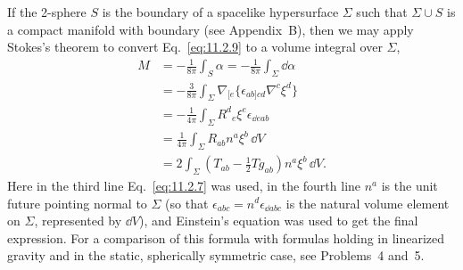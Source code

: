 If the 2-sphere \(S\) is the boundary of a spacelike hypersurface \(\Sigma\) such that
\(\Sigma\cup S\) is a compact manifold with boundary (see Appendix~B), then we may
apply Stokes's theorem to convert Eq.~\eqref{eq:11.2.9} to a volume integral over
\(\Sigma\),
\begin{equation}
  \begin{aligned}
  M&=-\frac{1}{8\pi}\int_S\alpha
    =-\frac{1}{8\pi}\int_\Sigma \dd\alpha\\
   &=-\frac{3}{8\pi}\int_\Sigma
     \nabla_{[e}\{\epsilon_{ab]cd}\nabla^c\xi^d\}\\
   &=-\frac{1}{4\pi}\int_\Sigma R^d{}_e\xi^e\epsilon_{\dd eab}\\
   &=\frac{1}{4\pi}\int_\Sigma R_{ab}n^a\xi^b\,\dd V\\
   &=2\int_\Sigma\left(T_{ab}-\frac12Tg_{ab}\right)n^a\xi^b\,\dd V.
  \end{aligned}
  \tag{11.2.10}\label{eq:11.2.10}
\end{equation}
Here in the third line Eq.~\eqref{eq:11.2.7} was used, in the fourth line \(n^a\) is
the unit future pointing normal to \(\Sigma\) (so that
\(\epsilon_{abc}=n^d\epsilon_{\dd abc}\) is the natural volume element on \(\Sigma\),
represented by \(\dd V\)), and Einstein's equation was used to get the final expression.
For a comparison of this formula with formulas holding in linearized gravity and in
the static, spherically symmetric case, see Problems~4 and~5.

